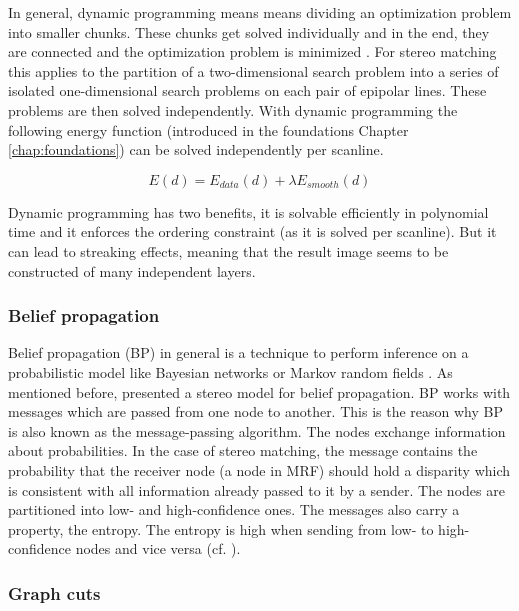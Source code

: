 In general, dynamic programming means means dividing an optimization problem into smaller chunks.
These chunks get solved individually and in the end, they are connected and the optimization problem is minimized \citep{angel1972dynamic, bellman2015applied, cyganek2011introduction}.
For stereo matching this applies to the partition of a two-dimensional search problem into a series of isolated one-dimensional search problems on each pair of epipolar lines.
These problems are then solved independently.
With dynamic programming the following energy function (introduced in the foundations Chapter \ref{chap:foundations}) can be solved independently per scanline.

\begin{equation}
  E(d) = E_{data}(d) + \lambda E_{smooth}(d)
\end{equation}

\noindent Dynamic programming has two benefits, it is solvable efficiently in polynomial time and it enforces the ordering constraint (as it is solved per scanline).
But it can lead to streaking effects, meaning that the result image seems to be constructed of many independent layers.

\subsubsection{Belief propagation}

Belief propagation (BP) in general is a technique to perform inference on a probabilistic model like Bayesian networks or Markov random fields \citep{yedidia2003understanding, tappen2003comparison, cyganek2011introduction}.
As mentioned before, \citeauthor{sun2003stereo} presented a stereo model for belief propagation.
BP works with messages which are passed from one node to another.
This is the reason why BP is also known as the message-passing algorithm.
The nodes exchange information about probabilities.
In the case of stereo matching, the message contains the probability that the receiver node (a node in MRF) should hold a disparity which is consistent with all information already passed to it by a sender.
The nodes are partitioned into low- and high-confidence ones.
The messages also carry a property, the entropy.
The entropy is high when sending from low- to high-confidence nodes and vice versa (cf. \citep{yedidia2003understanding, tappen2003comparison, cyganek2011introduction}).

\subsubsection{Graph cuts}

